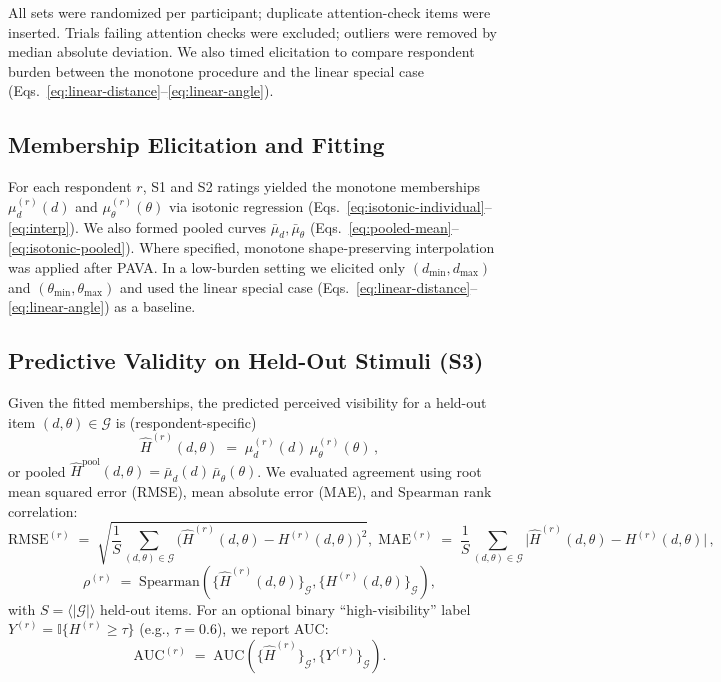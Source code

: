 \documentclass[final,3p,times,review]{elsarticle}
\begin{document}
All sets were randomized per participant; duplicate attention-check items were inserted. Trials failing attention checks were excluded; outliers were removed by median absolute deviation. We also timed elicitation to compare respondent burden between the monotone procedure and the linear special case (Eqs.~\eqref{eq:linear-distance}--\eqref{eq:linear-angle}).

\subsection{Membership Elicitation and Fitting}
For each respondent $r$, S1 and S2 ratings yielded the monotone memberships $\mu^{(r)}_d(d)$ and $\mu^{(r)}_\theta(\theta)$ via isotonic regression (Eqs.~\eqref{eq:isotonic-individual}--\eqref{eq:interp}). We also formed pooled curves $\bar{\mu}_d,\bar{\mu}_\theta$ (Eqs.~\eqref{eq:pooled-mean}--\eqref{eq:isotonic-pooled}). Where specified, monotone shape-preserving interpolation was applied after PAVA. In a low-burden setting we elicited only $(d_{\min},d_{\max})$ and $(\theta_{\min},\theta_{\max})$ and used the linear special case (Eqs.~\eqref{eq:linear-distance}--\eqref{eq:linear-angle}) as a baseline.

\subsection{Predictive Validity on Held-Out Stimuli (S3)}
Given the fitted memberships, the predicted perceived visibility for a held-out item $(d,\theta)\in\mathcal{G}$ is (respondent-specific)
\begin{equation}
\widehat{H}^{(r)}(d,\theta) \;=\; \mu^{(r)}_d(d)\,\mu^{(r)}_\theta(\theta)\,,
\label{eq:hhat}
\end{equation}
or pooled $\widehat{H}^{\mathrm{pool}}(d,\theta)=\bar{\mu}_d(d)\,\bar{\mu}_\theta(\theta)$. We evaluated agreement using root mean squared error (RMSE), mean absolute error (MAE), and Spearman rank correlation:
\begin{equation}
\mathrm{RMSE}^{(r)} \;=\; \sqrt{\frac{1}{S}\sum_{(d,\theta)\in \mathcal{G}}
\big(\widehat{H}^{(r)}(d,\theta)-H^{(r)}(d,\theta)\big)^2}, \;
\mathrm{MAE}^{(r)} \;=\; \frac{1}{S}\sum_{(d,\theta)\in \mathcal{G}}
\big|\widehat{H}^{(r)}(d,\theta)-H^{(r)}(d,\theta)\big|\,,
\label{eq:rmse-mae}
\end{equation}
\begin{equation}
\rho^{(r)} \;=\; \mathrm{Spearman}\!\left(
\{\widehat{H}^{(r)}(d,\theta)\}_{\mathcal{G}},
\{H^{(r)}(d,\theta)\}_{\mathcal{G}}
\right),
\label{eq:spearman}
\end{equation}
with $S{=}\langle |\mathcal{G}|\rangle$ held-out items. For an optional binary “high-visibility” label $Y^{(r)}=\mathbb{I}\{H^{(r)}\ge\tau\}$ (e.g., $\tau{=}0.6$), we report AUC:
\begin{equation}
\mathrm{AUC}^{(r)} \;=\; \mathrm{AUC}\!\left(\{\widehat{H}^{(r)}\}_{\mathcal{G}}, \{Y^{(r)}\}_{\mathcal{G}}\right).
\label{eq:auc}
\end{equation}
\end{document}
